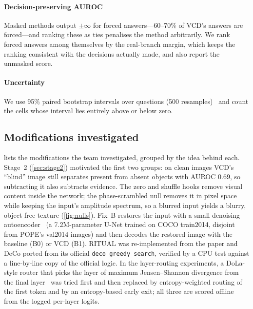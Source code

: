 \documentclass[10pt,a4paper]{article}
\newcommand{\code}[1]{\texttt{\small #1}}
\begin{document}
\paragraph{Decision-preserving AUROC} Masked methods output $\pm\infty$ for forced answers---60--70\% of VCD's answers are forced---and ranking these as ties penalises the method arbitrarily. We rank forced answers among themselves by the real-branch margin, which keeps the ranking consistent with the decisions actually made, and also report the unmasked score.

\paragraph{Uncertainty} We use 95\% paired bootstrap intervals over questions (500 resamples)~\citep{efron1993bootstrap} and count the cells whose interval lies entirely above or below zero.

\subsection{Modifications investigated}
 lists the modifications the team investigated, grouped by the idea behind each. Stage~2 (\cref{sec:stage2}) motivated the first two groups: on clean images VCD's ``blind'' image still separates present from absent objects with AUROC 0.69, so subtracting it also subtracts evidence. The zero and shuffle hooks remove visual content inside the network; the phase-scrambled null removes it in pixel space while keeping the input's amplitude spectrum, so a blurred input yields a blurry, object-free texture (\cref{fig:nulls}). Fix~B restores the input with a small denoising autoencoder~\citep{vincent2008dae} (a 7.2M-parameter U-Net trained on COCO train2014, disjoint from POPE's val2014 images) and then decodes the restored image with the baseline (B0) or VCD (B1). RITUAL was re-implemented from the paper and DeCo ported from its official \code{deco\_greedy\_search}, verified by a CPU test against a line-by-line copy of the official logic. In the layer-routing experiments, a DoLa-style router that picks the layer of maximum Jensen--Shannon divergence from the final layer~\citep{chuang2024dola} was tried first and then replaced by entropy-weighted routing of the first token and by an entropy-based early exit; all three are scored offline from the logged per-layer logits.
\end{document}
